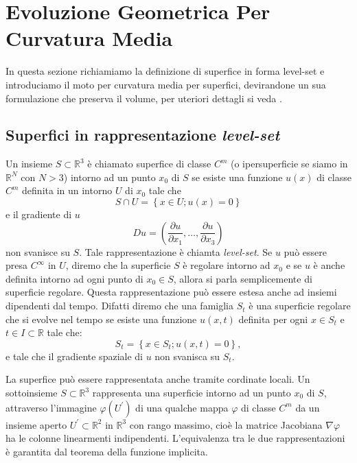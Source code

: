 \chapter{Evoluzione Geometrica Per Curvatura Media}
\label{cap:cap1}
In questa sezione richiamiamo la definizione di superfice in forma
level-set e introduciamo il moto per curvatura media per superfici,
devirandone un sua formulazione che preserva il volume, per uteriori
dettagli si veda \cite[][]{gui:sapiro,sapiro:tann}.
%
%
\section{Superfici in rappresentazione \emph{level-set}}
\label{sec:cp1-00}
Un insieme $S\subset\mathbb{R}^3$ è chiamato superfice di classe $C^m$ (o ipersuperficie se siamo in $\mathbb{R}^N$ con $N>3$) intorno ad un punto $x_0$ di $S$ se esiste una funzione $u(x)$ di classe $C^m$ definita in un intorno $U$ di $x_0$ tale che
\[
S\cap U=\left\{x\in U; u(x)=0\right\}
\]
e il gradiente di $u$
\[
 Du=\left(\frac{\partial u}{\partial x_1},\dots,\frac{\partial u}{\partial x_3}\right)
\]
non svanisce su $S$. Tale rappresentazione è chiamta \emph{level-set}. Se $u$ può essere presa $C^{\infty}$ in $U$, diremo che la superficie $S$ è regolare intorno ad $x_0$ e se $u$ è anche definita intorno ad ogni punto di $x_0\in S$, allora si parla semplicemente di superficie regolare. Questa rappresentazione può essere estesa anche ad insiemi dipendenti dal tempo. Difatti diremo che una famiglia $S_t$ è una superficie regolare che si evolve nel tempo se esiste una funzione $u(x,t)$ definita per ogni $x\in S_t$ e $t\in I\subset\mathbb{R}$ tale che:
\[
S_t=\left\{x\in S_t; u(x,t)=0\right\},
\]
e tale che il gradiente spaziale di $u$ non svanisca su $S_t$.
\begin{osservazione}
 La superfice può essere rappresentata anche tramite cordinate locali. Un sottoinsieme $S\subset\mathbb{R}^3$ rappresenta una superficie intorno ad un punto $x_0$ di $S$, attraverso l'immagine $\varphi(U^{'})$ di una qualche mappa $\varphi$ di classe $C^m$ da un insieme aperto $U^{'}\subset\mathbb{R}^2$ in $\mathbb{R}^3$ con rango massimo, cioè la matrice Jacobiana $\nabla\varphi$ ha le colonne linearmenti indipendenti.
L'equivalenza tra le due rappresentazioni è garantita dal teorema della funzione implicita.
\end{osservazione} 

